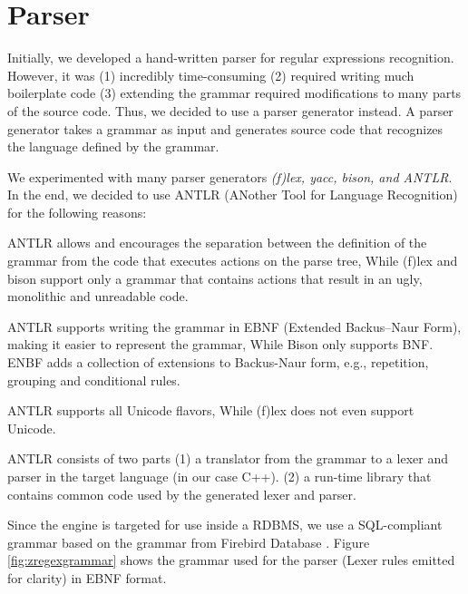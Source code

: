 \section{Parser}\label{section:parser}
Initially, we developed a hand-written parser for regular expressions recognition. However, it was (1) incredibly time-consuming (2) required writing much boilerplate code (3) extending the grammar required modifications to many parts of the source code. Thus, we decided to use a parser generator instead. A parser generator takes a grammar as input and generates source code that recognizes the language defined by the grammar.

We experimented with many parser generators \textit{(f)lex, yacc, bison, and ANTLR}. In the end, we decided to use ANTLR (ANother Tool for Language Recognition) for the following reasons:

\begin{packed_enum}
    \item ANTLR allows and encourages the separation between the definition of the grammar from the code that executes actions on the parse tree, While (f)lex and bison support only a grammar that contains actions that result in an ugly, monolithic and unreadable code.
    \item ANTLR supports writing the grammar in EBNF (Extended Backus–Naur Form), making it easier to represent the grammar, While Bison only supports BNF. ENBF adds a collection of extensions to Backus-Naur form, e.g., repetition, grouping and conditional rules.

    \item ANTLR supports all Unicode flavors, While (f)lex does not even support Unicode.
\end{packed_enum}

ANTLR consists of two parts (1) a translator from the grammar to a lexer and parser in the target language (in our case C++). (2) a run-time library that contains common code used by the generated lexer and parser.

\newpage
Since the engine is targeted for use inside a RDBMS, we use a SQL-compliant grammar based on the grammar from Firebird Database \cite{2022Firebird}. Figure \ref{fig:zregexgrammar} shows the grammar used for the parser (Lexer rules emitted for clarity) in EBNF format.

